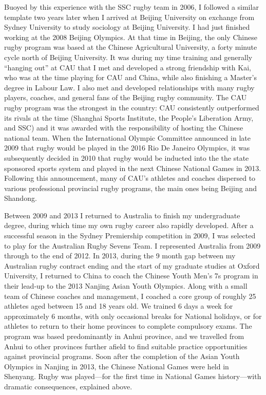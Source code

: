 {Buoyed by this experience with the SSC rugby team in 2006, I followed a similar template two years later when I arrived at Beijing University on exchange from Sydney University to study sociology at Beijing University.  I had just finished working at the 2008 Beijing Olympics. At that time in Beijing, the only Chinese rugby program was based at the Chinese Agricultural University, a forty minute cycle north of Beijing University.  It was during my time training and generally ``hanging out'' at CAU that I met and developed a strong friendship with Kai, who was at the time playing for CAU and China, while also finishing a Master's degree in Labour Law.  I also met and developed relationships with many rugby players, coaches, and general fans of the Beijing rugby community.  The CAU rugby program was the strongest in the country: CAU consistently outperformed its rivals at the time (Shanghai Sports Institute, the People's Liberation Army, and SSC) and it was awarded with the responsibility of hosting the Chinese national team.  When the International Olympic Committee announced in late 2009 that rugby would be played in the 2016 Rio De Janeiro Olympics, it was subsequently decided in 2010 that rugby would be inducted into the the state sponsored sports system and played in the next Chinese National Games in 2013.  Following this announcement, many of CAU's athletes and coaches dispersed to various professional provincial rugby programs, the main ones being Beijing and Shandong.

Between 2009 and 2013 I returned to Australia to finish my undergraduate degree, during which time my own rugby career also rapidly developed.  After a successful season in the Sydney Premiership competition in 2009, I was selected to play for the Australian Rugby Sevens Team. I represented Australia from 2009 through to the end of 2012.  In 2013, during the 9 month gap between my Australian rugby contract ending and the start of my graduate studies at Oxford University, I returned to China to coach the Chinese Youth Men's 7s program in their lead-up to the 2013 Nanjing Asian Youth Olympics.  Along with a small team of Chinese coaches and management, I coached a core group of roughly 25 athletes aged between 15 and 18 years old. We trained 6 days a week for approximately 6 months, with only occasional breaks for National holidays, or for athletes to return to their home provinces to complete compulsory exams.  The program was based predominantly in Anhui province, and we travelled from Anhui to other provinces further afield to find suitable practice opportunities against provincial programs.  Soon after the completion of the Asian Youth Olympics in Nanjing in 2013, the Chinese National Games were held in Shenyang. Rugby was played---for the first time in National Games history---with dramatic consequences, explained above.


}

